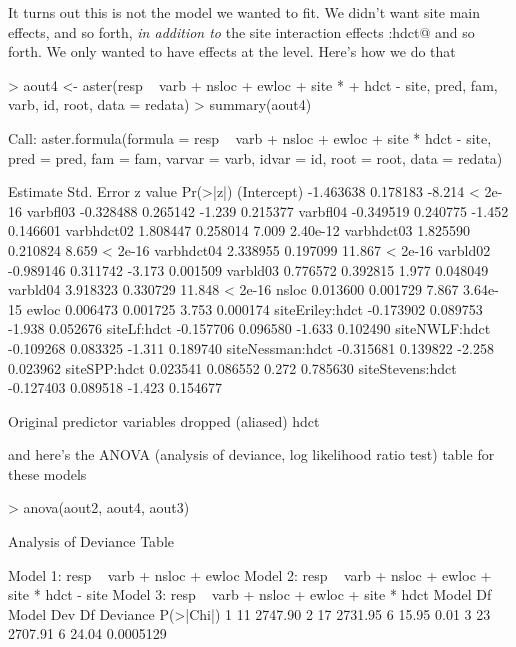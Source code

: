 \documentclass[11pt]{article}
\begin{document}
It turns out this is not the model we wanted to fit.  We didn't want
site main effects, \verb@siteEriley@ and so forth, \emph{in addition to}
the site interaction effects \verb@siteEriley:hdct@ and so forth.  We
only wanted \verb@site@ to have effects at the \verb@hdct@ level.
Here's how we do that
\begin{Schunk}
\begin{Sinput}
> aout4 <- aster(resp ~ varb + nsloc + ewloc + site * 
+     hdct - site, pred, fam, varb, id, root, data = redata)
> summary(aout4)
\end{Sinput}
\begin{Soutput}
Call:
aster.formula(formula = resp ~ varb + nsloc + ewloc + site * 
    hdct - site, pred = pred, fam = fam, varvar = varb, idvar = id, 
    root = root, data = redata)

                  Estimate Std. Error z value Pr(>|z|)
(Intercept)      -1.463638   0.178183  -8.214  < 2e-16
varbfl03         -0.328488   0.265142  -1.239 0.215377
varbfl04         -0.349519   0.240775  -1.452 0.146601
varbhdct02        1.808447   0.258014   7.009 2.40e-12
varbhdct03        1.825590   0.210824   8.659  < 2e-16
varbhdct04        2.338955   0.197099  11.867  < 2e-16
varbld02         -0.989146   0.311742  -3.173 0.001509
varbld03          0.776572   0.392815   1.977 0.048049
varbld04          3.918323   0.330729  11.848  < 2e-16
nsloc             0.013600   0.001729   7.867 3.64e-15
ewloc             0.006473   0.001725   3.753 0.000174
siteEriley:hdct  -0.173902   0.089753  -1.938 0.052676
siteLf:hdct      -0.157706   0.096580  -1.633 0.102490
siteNWLF:hdct    -0.109268   0.083325  -1.311 0.189740
siteNessman:hdct -0.315681   0.139822  -2.258 0.023962
siteSPP:hdct      0.023541   0.086552   0.272 0.785630
siteStevens:hdct -0.127403   0.089518  -1.423 0.154677

Original predictor variables dropped (aliased)
     hdct 
\end{Soutput}
\end{Schunk}
and here's the ANOVA (analysis of deviance, log likelihood ratio test)
table for these models
\begin{Schunk}
\begin{Sinput}
> anova(aout2, aout4, aout3)
\end{Sinput}
\begin{Soutput}
Analysis of Deviance Table

Model 1: resp ~ varb + nsloc + ewloc
Model 2: resp ~ varb + nsloc + ewloc + site * hdct - site
Model 3: resp ~ varb + nsloc + ewloc + site * hdct
  Model Df Model Dev Df Deviance P(>|Chi|)
1       11   2747.90                      
2       17   2731.95  6    15.95      0.01
3       23   2707.91  6    24.04 0.0005129
\end{Soutput}
\end{Schunk}
\end{document}
